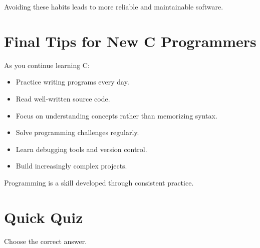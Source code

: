 \documentclass[12pt,openany]{book}
\begin{document}
Avoiding these habits leads to more reliable and maintainable software.

\section{Final Tips for New C Programmers}

As you continue learning C:

\begin{itemize}
    \item Practice writing programs every day.
    \item Read well-written source code.
    \item Focus on understanding concepts rather than memorizing syntax.
    \item Solve programming challenges regularly.
    \item Learn debugging tools and version control.
    \item Build increasingly complex projects.
\end{itemize}

Programming is a skill developed through consistent practice.

\section{Quick Quiz}

Choose the correct answer.
\end{document}

